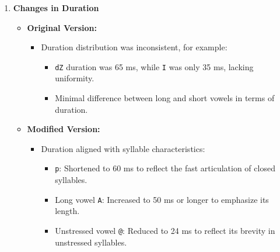 \documentclass{../labbook}
\begin{document}
\begin{solution}
\begin{enumerate}
    \item \textbf{Changes in Duration}
    \begin{itemize}
        \item \textbf{Original Version:}
        \begin{itemize}
            \item Duration distribution was inconsistent, for example:
            \begin{itemize}
                \item \texttt{dZ} duration was 65 ms, while \texttt{I} was only 35 ms, lacking uniformity.
                \item Minimal difference between long and short vowels in terms of duration.
            \end{itemize}
        \end{itemize}
        \item \textbf{Modified Version:}
        \begin{itemize}
            \item Duration aligned with syllable characteristics:
            \begin{itemize}
                \item \texttt{p}: Shortened to 60 ms to reflect the fast articulation of closed syllables.
                \item Long vowel \texttt{A}: Increased to 50 ms or longer to emphasize its length.
                \item Unstressed vowel \texttt{@}: Reduced to 24 ms to reflect its brevity in unstressed syllables.
            \end{itemize}
        \end{itemize}
    \end{itemize}
\end{enumerate}
\end{solution}
\end{document}
